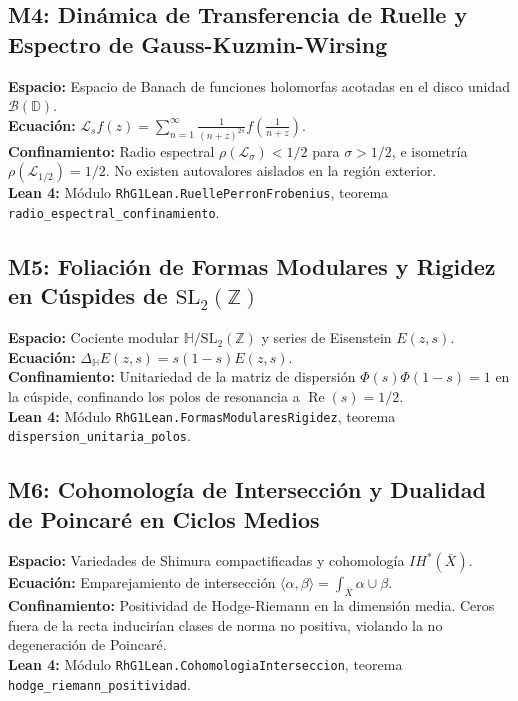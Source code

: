 \documentclass[11pt,a4paper]{article}
\begin{document}
\subsection{M4: Dinámica de Transferencia de Ruelle y Espectro de Gauss-Kuzmin-Wirsing}
\textbf{Espacio:} Espacio de Banach de funciones holomorfas acotadas en el disco unidad $\mathcal{B}(\mathbb{D})$.\\
\textbf{Ecuación:} $\mathcal{L}_s f(z) = \sum_{n=1}^\infty \frac{1}{(n+z)^{2s}} f\left(\frac{1}{n+z}\right)$.\\
\textbf{Confinamiento:} Radio espectral $\rho(\mathcal{L}_\sigma) < 1/2$ para $\sigma > 1/2$, e isometría $\rho(\mathcal{L}_{1/2}) = 1/2$. No existen autovalores aislados en la región exterior.\\
\textbf{Lean 4:} Módulo \texttt{RhG1Lean.RuellePerronFrobenius}, teorema \texttt{radio\_espectral\_confinamiento}.

\subsection{M5: Foliación de Formas Modulares y Rigidez en Cúspides de $\mathrm{SL}_2(\mathbb{Z})$}
\textbf{Espacio:} Cociente modular $\mathbb{H}/\mathrm{SL}_2(\mathbb{Z})$ y series de Eisenstein $E(z, s)$.\\
\textbf{Ecuación:} $\Delta_{\mathbb{H}} E(z, s) = s(1-s) E(z, s)$.\\
\textbf{Confinamiento:} Unitariedad de la matriz de dispersión $\Phi(s)\Phi(1-s) = 1$ en la cúspide, confinando los polos de resonancia a $\operatorname{Re}(s) = 1/2$.\\
\textbf{Lean 4:} Módulo \texttt{RhG1Lean.FormasModularesRigidez}, teorema \texttt{dispersion\_unitaria\_polos}.

\subsection{M6: Cohomología de Intersección y Dualidad de Poincaré en Ciclos Medios}
\textbf{Espacio:} Variedades de Shimura compactificadas y cohomología $IH^*(\bar{X})$.\\
\textbf{Ecuación:} Emparejamiento de intersección $\langle \alpha, \beta \rangle = \int_{\bar{X}} \alpha \cup \beta$.\\
\textbf{Confinamiento:} Positividad de Hodge-Riemann en la dimensión media. Ceros fuera de la recta inducirían clases de norma no positiva, violando la no degeneración de Poincaré.\\
\textbf{Lean 4:} Módulo \texttt{RhG1Lean.CohomologiaInterseccion}, teorema \texttt{hodge\_riemann\_positividad}.
\end{document}
